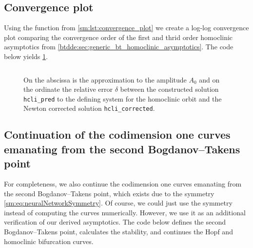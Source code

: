 \subsection{Convergence plot}
Using the function from \cref{sm:lst:convergence_plot} we create a log-log
convergence plot comparing the convergence order of the first and thrid order
homoclinic asymptotics from \cref{btdde:sec:generic_bt_homoclinic_asymptotics}.
The code below yields \cref{sm:fig:NeuralNetworkConvergencePlot}.
\inputminted[firstline=176, lastline=187]{MATLAB}{\pathToDDEBifToolDemos/neural_network_model/neural_network_model.m}
\begin{figure}[ht]
    \centering
        \caption{On the abscissa is the approximation to the amplitude $A_0$ and on
        the ordinate the relative error $\delta$ between the constructed solution
        \texttt{hcli_pred} to the defining system for the homoclinic orbit
        and the Newton corrected solution \texttt{hcli_corrected}.}
    \label{sm:fig:NeuralNetworkConvergencePlot}
\end{figure}

\subsection{Continuation of the codimension one curves emanating from the second Bogdanov--Takens point}
For completeness, we also continue the codimension one curves emanating from
the second Bogdanov--Takens point, which exists due to the symmetry
\cref{sm:eq:neuralNetworkSymmetry}. Of course, we could just use the symmetry
instead of computing the curves numerically. However, we use it as an
additional verification of our derived asymptotics. The code below defines the
second Bogdanov--Takens point, calculates the stability, and continues the Hopf
and homoclinic bifurcation curves.
\inputminted[firstline=189, lastline=216]{MATLAB}{\pathToDDEBifToolDemos/neural_network_model/neural_network_model.m}

